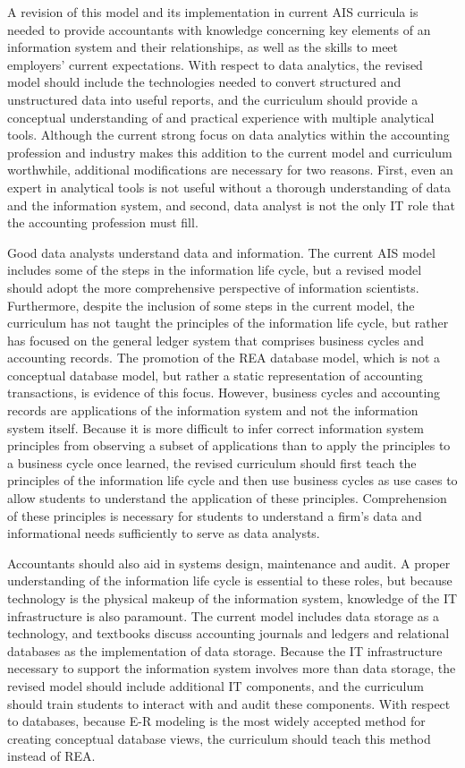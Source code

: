 \documentclass[12pt]{article}
\begin{document}
A revision of this model and its implementation in current AIS curricula is needed to provide accountants with knowledge concerning key elements of an information system and their relationships, as well as the skills to meet employers' current expectations. With respect to data analytics, the revised model should include the technologies needed to convert structured and unstructured data into useful reports, and the curriculum should provide a conceptual understanding of and practical experience with multiple analytical tools. Although the current strong focus on data analytics within the accounting profession and industry makes this addition to the current model and curriculum worthwhile, additional modifications are necessary for two reasons. First, even an expert in analytical tools is not useful without a thorough understanding of data and the information system, and second, data analyst is not the only IT role that the accounting profession must fill.

Good data analysts understand data and information. The current AIS model includes some of the steps in the information life cycle, but a revised model should adopt the more comprehensive perspective of information scientists. Furthermore, despite the inclusion of some steps in the current model, the curriculum has not taught the principles of the information life cycle, but rather has focused on the general ledger system that comprises business cycles and accounting records. The promotion of the REA database model, which is not a conceptual database model, but rather a static representation of accounting transactions, is evidence of this focus. However, business cycles and accounting records are applications of the information system and not the information system itself. Because it is more difficult to infer correct information system principles from observing a subset of applications than to apply the principles to a business cycle once learned, the revised curriculum should first teach the principles of the information life cycle and then use business cycles as use cases to allow students to understand the application of these principles. Comprehension of these principles is necessary for students to understand a firm's data and informational needs sufficiently to serve as data analysts.

Accountants should also aid in systems design, maintenance and audit. A proper understanding of the information life cycle is essential to these roles, but because technology is the physical makeup of the information system, knowledge of the IT infrastructure is also paramount. The current model includes data storage as a technology, and textbooks discuss accounting journals and ledgers and relational databases as the implementation of data storage. Because the IT infrastructure necessary to support the information system involves more than data storage, the revised model should include additional IT components, and the curriculum should train students to interact with and audit these components. With respect to databases, because E-R modeling is the most widely accepted method for creating conceptual database views, the curriculum should teach this method instead of REA.
\end{document}
